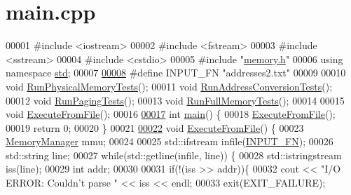 \hypertarget{main_8cpp_source}{}\section{main.\+cpp}
\label{main_8cpp_source}

\begin{DoxyCode}
00001 \textcolor{preprocessor}{#include <iostream>}
00002 \textcolor{preprocessor}{#include <fstream>}
00003 \textcolor{preprocessor}{#include <sstream>}
00004 \textcolor{preprocessor}{#include <cstdio>}
00005 \textcolor{preprocessor}{#include "\hyperlink{memory_8h}{memory.h}"}
00006 \textcolor{keyword}{using namespace }\hyperlink{namespacestd}{std};
00007 
\hypertarget{main_8cpp_source.tex_l00008}{}\hyperlink{main_8cpp_a3d58a37eb1401f1e1e0a2e43a28e0675}{00008} \textcolor{preprocessor}{#define INPUT\_FN "addresses2.txt"}
00009 
00010 \textcolor{keywordtype}{void} \hyperlink{main_8cpp_a5aa22abf10bfd6c47d6f04571ea77f1d}{RunPhysicalMemoryTests}();
00011 \textcolor{keywordtype}{void} \hyperlink{main_8cpp_a9d50d2049f7ee3c00984500c882ddde9}{RunAddressConversionTests}();
00012 \textcolor{keywordtype}{void} \hyperlink{main_8cpp_a31aaac7e09dbfca2c888cb8e319fcdbd}{RunPagingTests}();
00013 \textcolor{keywordtype}{void} \hyperlink{main_8cpp_ac5347a09d49e669bd79b50bf65d74e7d}{RunFullMemoryTests}();
00014 
00015 \textcolor{keywordtype}{void} \hyperlink{main_8cpp_a42ef34a387e48b6661322f8f1d6da730}{ExecuteFromFile}();
00016 
\hypertarget{main_8cpp_source.tex_l00017}{}\hyperlink{main_8cpp_ae66f6b31b5ad750f1fe042a706a4e3d4}{00017} \textcolor{keywordtype}{int} \hyperlink{main_8cpp_ae66f6b31b5ad750f1fe042a706a4e3d4}{main}() \{
00018     \hyperlink{main_8cpp_a42ef34a387e48b6661322f8f1d6da730}{ExecuteFromFile}();
00019     \textcolor{keywordflow}{return} 0;
00020 \}
00021 
\hypertarget{main_8cpp_source.tex_l00022}{}\hyperlink{main_8cpp_a42ef34a387e48b6661322f8f1d6da730}{00022} \textcolor{keywordtype}{void} \hyperlink{main_8cpp_a42ef34a387e48b6661322f8f1d6da730}{ExecuteFromFile}() \{
00023     \hyperlink{classMemoryManager}{MemoryManager} mmu;
00024 
00025     std::ifstream infile(\hyperlink{main_8cpp_a3d58a37eb1401f1e1e0a2e43a28e0675}{INPUT\_FN});
00026     std::string line;
00027     \textcolor{keywordflow}{while}(std::getline(infile, line)) \{
00028         std::istringstream iss(line);
00029         \textcolor{keywordtype}{int} addr;
00030         
00031         \textcolor{keywordflow}{if}(!(iss >> addr))\{
00032             cout << \textcolor{stringliteral}{"I/O ERROR: Couldn't parse "} << iss << endl;
00033             exit(EXIT\_FAILURE);

\end{DoxyCode}
